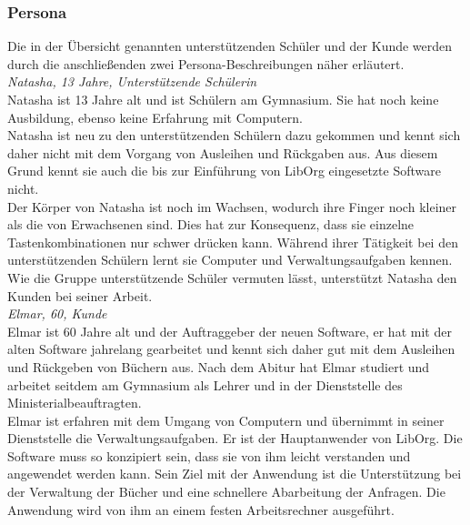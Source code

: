 \subsubsection{Persona}
Die in der Übersicht genannten unterstützenden Schüler und der Kunde werden durch die anschließenden zwei Persona-Beschreibungen näher erläutert.\bigskip \\
\emph{Natasha, 13 Jahre, Unterstützende Schülerin}\\
Natasha ist 13 Jahre alt und ist Schülern am Gymnasium. Sie hat noch keine Ausbildung, ebenso keine Erfahrung mit Computern.\\
Natasha ist neu zu den unterstützenden Schülern dazu gekommen und kennt sich daher nicht mit dem Vorgang von Ausleihen und Rückgaben aus. Aus diesem Grund kennt sie auch die bis zur Einführung von LibOrg eingesetzte Software nicht.\\
Der Körper von Natasha ist noch im Wachsen, wodurch ihre Finger noch kleiner als die von Erwachsenen sind. Dies hat zur Konsequenz, dass sie einzelne Tastenkombinationen nur schwer drücken kann. Während ihrer Tätigkeit bei den unterstützenden Schülern lernt sie Computer und Verwaltungsaufgaben kennen. Wie die Gruppe unterstützende Schüler vermuten lässt, unterstützt Natasha den Kunden bei seiner Arbeit.\bigskip \\
\emph{Elmar, 60, Kunde}\\
Elmar ist 60 Jahre alt und der Auftraggeber der neuen Software, er hat mit der alten Software jahrelang gearbeitet und kennt sich daher gut mit dem Ausleihen und Rückgeben von Büchern aus. Nach dem Abitur hat Elmar studiert und arbeitet seitdem am Gymnasium als Lehrer und in der Dienststelle des Ministerialbeauftragten.\\
Elmar ist erfahren mit dem Umgang von Computern und übernimmt in seiner Dienststelle die Verwaltungsaufgaben. Er ist der Hauptanwender von LibOrg. Die Software muss so konzipiert sein, dass sie von ihm leicht verstanden und angewendet werden kann. Sein Ziel mit der Anwendung ist die Unterstützung bei der Verwaltung der Bücher und eine schnellere Abarbeitung der Anfragen. Die Anwendung wird von ihm an einem festen Arbeitsrechner ausgeführt.